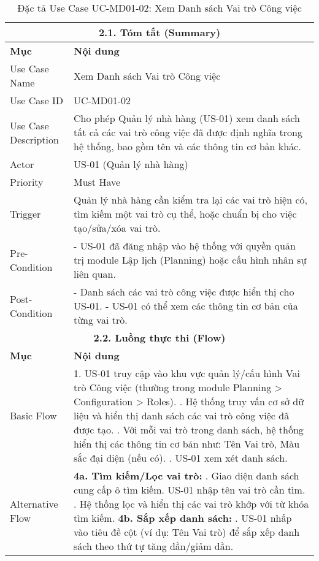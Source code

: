 \begin{longtable}{|m{4cm}|p{11cm}|}
\caption{Đặc tả Use Case UC-MD01-02: Xem Danh sách Vai trò Công việc} \label{tab:uc_md01_02_revised} \\
\hline
\multicolumn{2}{|c|}{\textbf{2.1. Tóm tắt (Summary)}} \\
\hline
\textbf{Mục} & \textbf{Nội dung} \\
\hline
\endhead %
\hline
\endfoot %
\hline
\endlastfoot %
Use Case Name & Xem Danh sách Vai trò Công việc \\
\hline
Use Case ID & UC-MD01-02 \\
\hline
Use Case Description & Cho phép Quản lý nhà hàng (US-01) xem danh sách tất cả các vai trò công việc đã được định nghĩa trong hệ thống, bao gồm tên và các thông tin cơ bản khác. \\
\hline
Actor & US-01 (Quản lý nhà hàng) \\
\hline
Priority & Must Have \\
\hline
Trigger & Quản lý nhà hàng cần kiểm tra lại các vai trò hiện có, tìm kiếm một vai trò cụ thể, hoặc chuẩn bị cho việc tạo/sửa/xóa vai trò. \\
\hline
Pre-Condition & - US-01 đã đăng nhập vào hệ thống với quyền quản trị module Lập lịch (Planning) hoặc cấu hình nhân sự liên quan. \\
\hline
Post-Condition & - Danh sách các vai trò công việc được hiển thị cho US-01. \newline - US-01 có thể xem các thông tin cơ bản của từng vai trò. \\
\hline
\multicolumn{2}{|c|}{\textbf{2.2. Luồng thực thi (Flow)}} \\
\hline
\textbf{Mục} & \textbf{Nội dung} \\
\hline
Basic Flow & 1. US-01 truy cập vào khu vực quản lý/cấu hình Vai trò Công việc (thường trong module Planning > Configuration > Roles). \newline 2. Hệ thống truy vấn cơ sở dữ liệu và hiển thị danh sách các vai trò công việc đã được tạo. \newline 3. Với mỗi vai trò trong danh sách, hệ thống hiển thị các thông tin cơ bản như: Tên Vai trò, Màu sắc đại diện (nếu có). \newline 4. US-01 xem xét danh sách. \\
\hline
Alternative Flow & \textbf{4a. Tìm kiếm/Lọc vai trò:} \newline    1. Giao diện danh sách cung cấp ô tìm kiếm. US-01 nhập tên vai trò cần tìm. \newline    2. Hệ thống lọc và hiển thị các vai trò khớp với từ khóa tìm kiếm. \newline \textbf{4b. Sắp xếp danh sách:} \newline    1. US-01 nhấp vào tiêu đề cột (ví dụ: Tên Vai trò) để sắp xếp danh sách theo thứ tự tăng dần/giảm dần. \\

\end{longtable}
